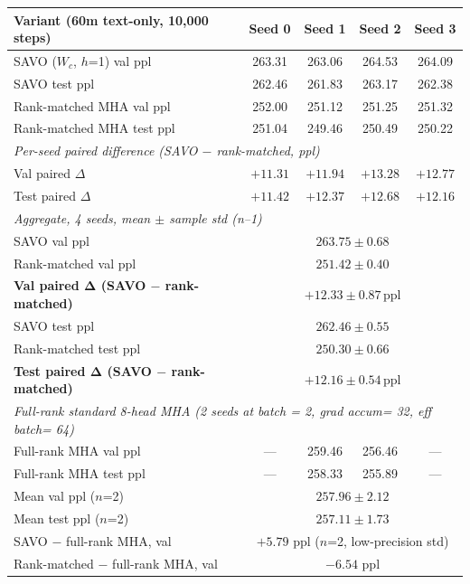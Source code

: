 \begin{table}[H]
\centering
\small
\begin{tabular}{lcccc}
\toprule
Variant (60m text-only, 10,000 steps) & Seed 0 & Seed 1 & Seed 2 & Seed 3 \\
\midrule
SAVO ($W_c$, $h$=1) val ppl & 263.31 & 263.06 & 264.53 & 264.09 \\
SAVO test ppl & 262.46 & 261.83 & 263.17 & 262.38 \\
Rank-matched MHA val ppl & 252.00 & 251.12 & 251.25 & 251.32 \\
Rank-matched MHA test ppl & 251.04 & 249.46 & 250.49 & 250.22 \\
\midrule
\multicolumn{5}{l}{\textit{Per-seed paired difference (SAVO $-$ rank-matched, ppl)}} \\
Val paired $\Delta$ & $+11.31$ & $+11.94$ & $+13.28$ & $+12.77$ \\
Test paired $\Delta$ & $+11.42$ & $+12.37$ & $+12.68$ & $+12.16$ \\
\midrule
\multicolumn{5}{l}{\textit{Aggregate, 4 seeds, mean $\pm$ sample std (n--1)}} \\
SAVO val ppl & \multicolumn{4}{c}{$263.75 \pm 0.68$} \\
Rank-matched val ppl & \multicolumn{4}{c}{$251.42 \pm 0.40$} \\
\textbf{Val paired $\boldsymbol{\Delta}$ (SAVO $-$ rank-matched)} & \multicolumn{4}{c}{$\boldsymbol{+12.33 \pm 0.87}$\,ppl} \\
SAVO test ppl & \multicolumn{4}{c}{$262.46 \pm 0.55$} \\
Rank-matched test ppl & \multicolumn{4}{c}{$250.30 \pm 0.66$} \\
\textbf{Test paired $\boldsymbol{\Delta}$ (SAVO $-$ rank-matched)} & \multicolumn{4}{c}{$\boldsymbol{+12.16 \pm 0.54}$\,ppl} \\
\midrule
\multicolumn{5}{l}{\textit{Full-rank standard 8-head MHA (2 seeds at batch = 2, grad accum= 32, eff batch= 64)}} \\
Full-rank MHA val ppl & --- & 259.46 & 256.46 & --- \\
Full-rank MHA test ppl & --- & 258.33 & 255.89 & --- \\
Mean val ppl ($n$=2) & \multicolumn{4}{c}{$257.96 \pm 2.12$} \\
Mean test ppl ($n$=2) & \multicolumn{4}{c}{$257.11 \pm 1.73$} \\
SAVO $-$ full-rank MHA, val & \multicolumn{4}{c}{$+5.79$ ppl ($n$=2, low-precision std)} \\
Rank-matched $-$ full-rank MHA, val & \multicolumn{4}{c}{$-6.54$ ppl} \\

\end{tabular}
\end{table}

